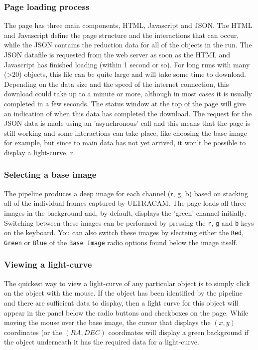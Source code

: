 \subsubsection{Page loading process}
The page has three main components, HTML, Javascript and JSON. The HTML and Javascript define the page structure and the interactions that can occur, while the JSON contains the reduction data for all of the objects in the run. The JSON datafile is requested from the web server as soon as the HTML and Javascript has finished loading (within 1 second or so). For long runs with many (>20) objects, this file can be quite large and will take some time to download. Depending on the data size and the speed of the internet connection, this download could take up to a minute or more, although in most cases it is usually completed in a few seconds. The status window at the top of the page will give an indication of when this data has completed the download. The request for the JSON data is made using an 'asynchronous' call and this means that the page is still working and some interactions can take place, like choosing the base image for example, but since to main data has not yet arrived, it won't be possible to display a light-curve.  
r
\subsubsection{Selecting a base image}
The pipeline produces a deep image for each channel (r, g, b) based on stacking all of the individual frames captured by ULTRACAM. The page loads all three images in the background and, by default, displays the 'green' channel initially. Switching between these images can be performed by pressing the \texttt{r}, \texttt{g} and \texttt{b} keys on the keyboard. You can also switch these images by slecteing either the \texttt{Red},  \texttt{Green} or \texttt{Blue} of the \texttt{Base Image} radio options found below the image itself.

\subsubsection{Viewing a light-curve}
The quickest way to view a light-curve of any particular object is to simply click on the object with the mouse. If the object has been identified by the pipeline and there are sufficient data to display, then a light curve for this object will appear in the panel below the radio buttons and checkboxes on the page. While moving the mouse over the base image, the cursor that displays the $(x, y)$ coordinates (or the $(RA, DEC)$ coordinates will display a green background if the object underneath it has the required data for a light-curve.

